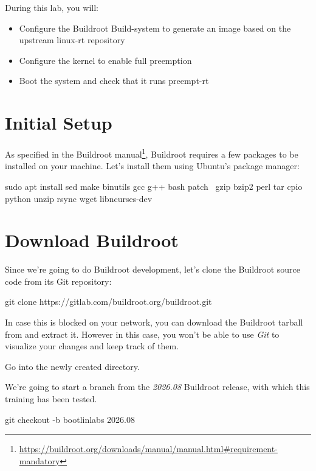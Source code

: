 
During this lab, you will:
\begin{itemize}
	\item Configure the Buildroot Build-system to generate an image based on the upstream linux-rt repository
	\item Configure the kernel to enable full preemption
	\item Boot the system and check that it runs preempt-rt
\end{itemize}

\section{Initial Setup}
As specified in the Buildroot
manual\footnote{\url{https://buildroot.org/downloads/manual/manual.html\#requirement-mandatory}},
Buildroot requires a few packages to be installed on your
machine. Let's install them using Ubuntu's package manager:

\begin{bashinput}
sudo apt install sed make binutils gcc g++ bash patch \
  gzip bzip2 perl tar cpio python unzip rsync wget libncurses-dev
\end{bashinput}

\section{Download Buildroot}

Since we're going to do Buildroot development, let's clone the
Buildroot source code from its Git repository:

\begin{bashinput}
git clone https://gitlab.com/buildroot.org/buildroot.git
\end{bashinput}

In case this is blocked on your network, you can download the Buildroot
tarball \code{buildroot-2026.08.tar.bz2} from
 and extract it. However in this
case, you won't be able to use {\em Git} to visualize your changes and
keep track of them.

Go into the newly created  directory.

We're going to start a branch from the {\em 2026.08} Buildroot
release, with which this training has been tested.

\begin{bashinput}
git checkout -b bootlinlabs 2026.08
\end{bashinput}

